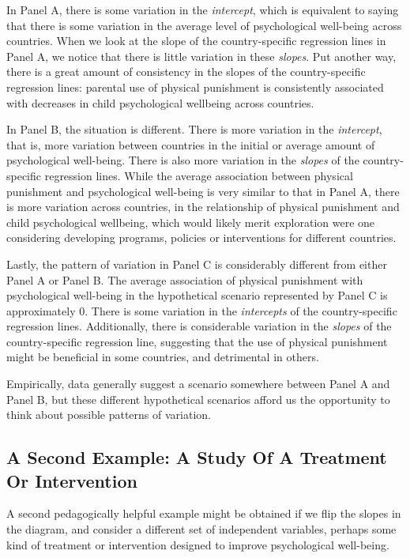 \documentclass[
  letterpaper,
  DIV=11,
  numbers=noendperiod]{scrreprt}
\begin{document}
In Panel A, there is some variation in the \emph{intercept}, which is
equivalent to saying that there is some variation in the average level
of psychological well-being across countries. When we look at the slope
of the country-specific regression lines in Panel A, we notice that
there is little variation in these \emph{slopes}. Put another way, there
is a great amount of consistency in the slopes of the country-specific
regression lines: parental use of physical punishment is consistently
associated with decreases in child psychological wellbeing across
countries.

In Panel B, the situation is different. There is more variation in the
\emph{intercept}, that is, more variation between countries in the
initial or average amount of psychological well-being. There is also
more variation in the \emph{slopes} of the country-specific regression
lines. While the average association between physical punishment and
psychological well-being is very similar to that in Panel A, there is
more variation across countries, in the relationship of physical
punishment and child psychological wellbeing, which would likely merit
exploration were one considering developing programs, policies or
interventions for different countries.

Lastly, the pattern of variation in Panel C is considerably different
from either Panel A or Panel B. The average association of physical
punishment with psychological well-being in the hypothetical scenario
represented by Panel C is approximately 0. There is some variation in
the \emph{intercepts} of the country-specific regression lines.
Additionally, there is considerable variation in the \emph{slopes} of
the country-specific regression line, suggesting that the use of
physical punishment might be beneficial in some countries, and
detrimental in others.

Empirically, data generally suggest a scenario somewhere between Panel A
and Panel B, but these different hypothetical scenarios afford us the
opportunity to think about possible patterns of variation.

\hypertarget{a-second-example-a-study-of-a-treatment-or-intervention}{%
\subsection{A Second Example: A Study Of A Treatment Or
Intervention}\label{a-second-example-a-study-of-a-treatment-or-intervention}}

A second pedagogically helpful example might be obtained if we flip the
slopes in the diagram, and consider a different set of independent
variables, perhaps some kind of treatment or intervention designed to
improve psychological well-being.
\end{document}
